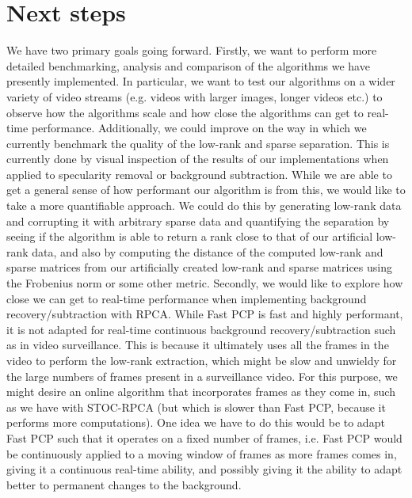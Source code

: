 \documentclass[oneside]{article}
\begin{document}
\section{Next steps}
We have two primary goals going forward. Firstly, we want to perform more detailed benchmarking, analysis and comparison of the algorithms we have presently implemented. In particular, we want to test our algorithms on a wider variety of video streams (e.g. videos with larger images, longer videos etc.) to observe how the algorithms scale and how close the algorithms can get to real-time performance. Additionally, we could improve on the way in which we currently benchmark the quality of the low-rank and sparse separation. This is currently done by visual inspection of the results of our implementations when applied to specularity removal or background subtraction. While we are able to get a general sense of how performant our algorithm is from this, we would like to take a more quantifiable approach. We could do this by generating low-rank data and corrupting it with arbitrary sparse data and quantifying the separation by seeing if the algorithm is able to return a rank close to that of our artificial low-rank data, and also by computing the distance of the computed low-rank and sparse matrices from our artificially created low-rank and sparse matrices using the Frobenius norm or some other metric.\newline\newline
Secondly, we would like to explore how close we can get to real-time performance when implementing background recovery/subtraction with RPCA. While Fast PCP is fast and highly performant, it is not adapted for real-time continuous background recovery/subtraction such as in video surveillance. This is because it ultimately uses all the frames in the video to perform the low-rank extraction, which might be slow and unwieldy for the large numbers of frames present in a surveillance video. For this purpose, we might desire an online algorithm that incorporates frames as they come in, such as we have with STOC-RPCA (but which is slower than Fast PCP, because it performs more computations). One idea we have to do this would be to adapt Fast PCP such that it operates on a fixed number of frames, i.e. Fast PCP would be continuously applied to a moving window of frames as more frames comes in, giving it a continuous real-time ability, and possibly giving it the ability to adapt better to permanent changes to the background.\newline\newline
\end{document}
